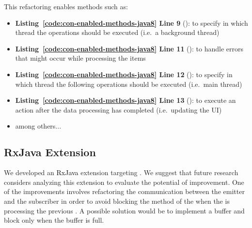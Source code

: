 \documentclass[type=bsc,accentcolor=tud9c]{tudthesis}
\newcommand{\framework}[1]{\textcolor{black}{#1}}
\begin{document}


This refactoring enables methods such as:
\begin{itemize}
	\item {\bf Listing~\ref{code:con-enabled-methods-java8} Line 9} (): to specify in which thread the operations should be executed (i.e.~a background thread)
	\item {\bf Listing~\ref{code:con-enabled-methods-java8} Line 11} (): to handle errors that might occur while processing the items
	\item {\bf Listing~\ref{code:con-enabled-methods-java8} Line 12} (): to specify in which thread the following operations should be executed (i.e.~main thread)
	\item {\bf Listing~\ref{code:con-enabled-methods-java8} Line 13} (): to execute an action after the data processing has completed (i.e.~updating the UI)
	\item among others...
\end{itemize}



\subsection{RxJava Extension}
We developed an \framework{RxJava} extension targeting . We suggest that future research considers analyzing this extension to evaluate the potential of improvement. One of the improvements involves refactoring the communication between the emitter  and the subscriber  in order to avoid blocking the  method of the  when the  is processing the previous . A possible solution would be to implement a buffer and block only when the buffer is full.


\nocite{*}



\def\appendixstart{\chapter{Appendix} \section{SwingWorker API}\label{swingworkerapi}}


\end{document}
